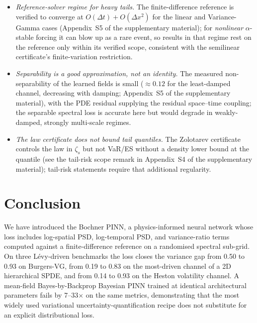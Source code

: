 \documentclass[review,12pt]{elsarticle}
\begin{document}
\begin{itemize}
matrix, which is not lower-bounded here. Lower-bounding
$\lambda_{\min}(K^{\mathrm{spec}})$ is the remaining open problem
in making the end-to-end bound fully constructive
(see Appendix~S1 of the supplementary material).
\item \emph{Reference-solver regime for heavy tails.} The
finite-difference reference is verified to converge at
$O(\Delta t) + O(\Delta x^2)$ for the linear and Variance-Gamma cases
(Appendix~S5 of the supplementary material); for \emph{nonlinear}
$\alpha$-stable forcing it can blow up as a rare event, so results in
that regime rest on the reference only within its verified scope,
consistent with the semilinear certificate's finite-variation
restriction.
\item \emph{Separability is a good approximation, not an identity.}
The measured non-separability of the learned fields is small
($\approx 0.12$ for the least-damped channel, decreasing with damping;
Appendix~S5 of the supplementary material), with the PDE residual
supplying the residual space--time coupling; the separable spectral
loss is accurate here but would degrade in weakly-damped, strongly
multi-scale regimes.
\item \emph{The law certificate does not bound tail quantiles.} The
Zolotarev certificate controls the law in $\zeta_s$ but not VaR/ES
without a density lower bound at the quantile (see the tail-risk scope
remark in Appendix~S4 of the supplementary material); tail-risk
statements require that additional regularity.
\end{itemize}

\section{Conclusion}
\label{sec:conclusion}

We have introduced the Bochner PINN, a physics-informed neural
network whose loss includes log-spatial PSD, log-temporal PSD,
and variance-ratio terms computed against a finite-difference
reference on a randomised spectral sub-grid. On three L\'evy-driven
benchmarks the loss closes the variance gap from 0.50 to 0.93 on
Burgers-VG, from 0.19 to 0.83 on the most-driven channel of a
2D hierarchical SPDE, and from 0.14 to 0.93 on the Heston
volatility channel. A mean-field Bayes-by-Backprop Bayesian PINN
trained at identical architectural parameters fails by
7--33\(\times\) on the same metrics, demonstrating that the most
widely used variational uncertainty-quantification recipe does
not substitute for an explicit distributional loss.
\end{document}
